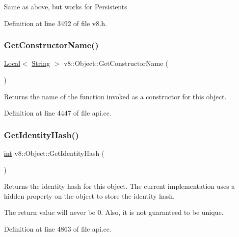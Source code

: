 Same as above, but works for Persistents 

Definition at line 3492 of file v8.\+h.

\mbox{\label{classv8_1_1Object_adfa3382c230ccbd88f9be12e2512eab8}} 
\subsubsection{\texorpdfstring{Get\+Constructor\+Name()}{GetConstructorName()}}
{\footnotesize\ttfamily \mbox{\hyperlink{classv8_1_1Local}{Local}}$<$ \mbox{\hyperlink{classv8_1_1String}{String}} $>$ v8\+::\+Object\+::\+Get\+Constructor\+Name (\begin{DoxyParamCaption}{ }\end{DoxyParamCaption})}

Returns the name of the function invoked as a constructor for this object. 

Definition at line 4447 of file api.\+cc.

\mbox{\label{classv8_1_1Object_ac1ece41e81a499920ec3a2a3471653bc}} 
\subsubsection{\texorpdfstring{Get\+Identity\+Hash()}{GetIdentityHash()}}
{\footnotesize\ttfamily \mbox{\hyperlink{classint}{int}} v8\+::\+Object\+::\+Get\+Identity\+Hash (\begin{DoxyParamCaption}{ }\end{DoxyParamCaption})}

Returns the identity hash for this object. The current implementation uses a hidden property on the object to store the identity hash.

The return value will never be 0. Also, it is not guaranteed to be unique. 

Definition at line 4863 of file api.\+cc.

\mbox{\label{classv8_1_1Object_aa3324fdf652d8ac3b2f27faa0559231d}} 
